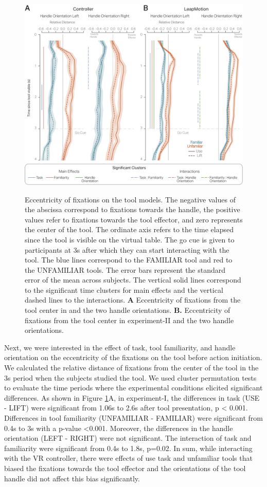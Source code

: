 \begin{figure}[ht]
    \centering
    \includegraphics[width=0.9\linewidth]{source/figures/result/deviation_from_center_new.png} \\
    \caption[]{Eccentricity of fixations on the tool models. The negative values of the abscissa correspond to fixations towards the handle, the positive values refer to fixations towards the tool effector, and zero represents the center of the tool. The ordinate axis refers to the time elapsed since the tool is visible on the virtual table. The go cue is given to participants at 3s after which they can start interacting with the tool. The blue lines correspond to the FAMILIAR tool and red to the UNFAMILIAR tools. The error bars represent the standard error of the mean across subjects.  The vertical solid lines correspond to the significant time clusters for main effects and the vertical dashed lines to the interactions. \textbf{A} Eccentricity of fixations from the tool center in and the two handle orientations. \textbf{B.} Eccentricity of fixations from the tool center in experiment-II and the two handle orientations.
}
    \label{figure:dev_from_center}
\end{figure}

Next, we were interested in the effect of task, tool familiarity, and handle orientation on the eccentricity of the fixations on the tool before action initiation. We calculated the relative distance of fixations from the center of the tool in the 3s period when the subjects studied the tool. We used cluster permutation tests to evaluate the time periods where the experimental conditions elicited significant differences. As shown in Figure \ref{figure:dev_from_center}A, in experiment-I, the differences in task (USE - LIFT) were significant from 1.06s to 2.6s after tool presentation, p < 0.001. Differences in tool familiarity (UNFAMILIAR - FAMILIAR) were significant from 0.4s to 3s with a p-value <0.001. Moreover, the differences in the handle orientation (LEFT - RIGHT) were not significant. The interaction of task and familiarity were significant from 0.4s to 1.8s, p=0.02. In sum, while interacting with the VR controller, there were effects of use task and unfamiliar tools that biased the fixations towards the tool effector and the orientations of the tool handle did not affect this bias significantly.

